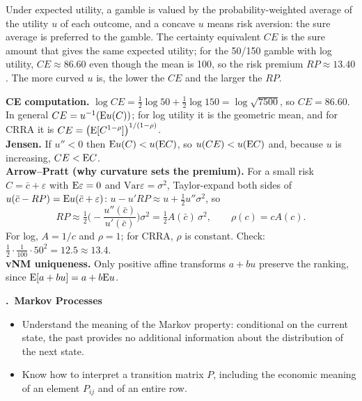 \documentclass[11pt]{article}
\newcounter{qn}
\newcommand{\question}[1]{\par\needspace{14\baselineskip}\refstepcounter{qn}\medskip
{\bfseries\color{ink}\large \theqn.\ #1}\par\smallskip}
\newcommand{\Var}{\mathrm{Var}}
\begin{document}
\begin{resp}
\begin{minipage}[t]{0.62\textwidth}\vspace{0pt}
Under expected utility, a gamble is valued by the probability-weighted average of the utility $u$ of each outcome, and a concave $u$ means risk aversion: the sure average is preferred to the gamble. The certainty equivalent $CE$ is the sure amount that gives the same expected utility; for the 50/150 gamble with log utility, $CE\approx86.60$ even though the mean is 100, so the risk premium $RP\approx13.40$. The more curved $u$ is, the lower the $CE$ and the larger the $RP$.
\end{minipage}\hfill
\begin{minipage}[t]{0.34\textwidth}\vspace{0pt}\centering
\scalebox{0.75}{\figCE}
\end{minipage}
\end{resp}
\begin{intu}
\textbf{CE computation.} $\log CE=\tfrac12\log50+\tfrac12\log150=\log\sqrt{7500}$, so $CE=86.60$. In general $CE=u^{-1}(\mathrm{E} u(C))$; for log utility it is the geometric mean, and for CRRA it is $CE=\big(\mathrm{E}[C^{1-\rho}]\big)^{1/(1-\rho)}$.\\
\textbf{Jensen.} If $u''<0$ then $\mathrm{E} u(C)<u(\mathrm{E} C)$, so $u(CE)<u(\mathrm{E} C)$ and, because $u$ is increasing, $CE<\mathrm{E} C$.\\
\textbf{Arrow--Pratt (why curvature sets the premium).} For a small risk $C=\bar c+\varepsilon$ with $\mathrm{E}\varepsilon=0$ and $\Var\varepsilon=\sigma^2$, Taylor-expand both sides of $u(\bar c-RP)=\mathrm{E} u(\bar c+\varepsilon)$: $u-u'RP\approx u+\tfrac12u''\sigma^2$, so
\[RP\approx\tfrac12\Big(-\frac{u''(\bar c)}{u'(\bar c)}\Big)\sigma^2=\tfrac12A(\bar c)\,\sigma^2,\qquad \rho(c)=cA(c).\]
For log, $A=1/c$ and $\rho=1$; for CRRA, $\rho$ is constant. Check: $\tfrac12\cdot\tfrac1{100}\cdot50^2=12.5\approx13.4$.\\
\textbf{vNM uniqueness.} Only positive affine transforms $a+bu$ preserve the ranking, since $\mathrm{E}[a+bu]=a+b\mathrm{E} u$.
\end{intu}

\question{Markov Processes}
\begin{itemize}[leftmargin=1.2em,itemsep=0pt]\itshape
\item Understand the meaning of the Markov property: conditional on the current state, the past provides no additional information about the distribution of the next state.
\item Know how to interpret a transition matrix $P$, including the economic meaning of an element $P_{ij}$ and of an entire row.
\end{itemize}
\end{document}
